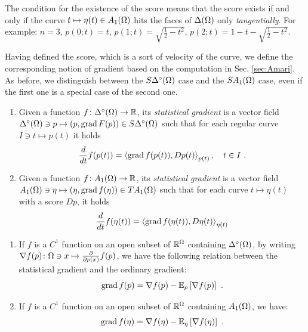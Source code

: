 \documentclass[12pt,a4paper]{amsart}
\begin{document}
\begin{remark}
  The condition for the existence of the score means that the score exists if and only if the curve $t \mapsto \eta(t) \in \AffineO$ hits the faces of $\SimO$ only \emph{tangentially}. For example: $n = 3$, $p(0;t) = t$, $p(1;t) = \sqrt{\frac12 - t^2}$, $p(2;t) = 1 - t - \sqrt{\frac12 - t^2}$. 
\end{remark}

Having defined the score, which is a sort of velocity of the curve, we define the corresponding notion of gradient based on the computation in Sec. \ref{sec:Amari}. As before, we distinguish between the $\SoSimO$ case and the $\SAffineO$ case, even if the first one is a special case of the second one.

\begin{definition}
\begin{enumerate}
\item Given a function $f \colon \oSimO \to \reals$, its \emph{statistical gradient} is a vector field $\oSimO \ni p \mapsto (p,\grad F(p)) \in \SoSimO$ such that for each regular curve $I \ni t \mapsto p(t)$ it holds
  \begin{equation*}
    \derivby t f(p(t)) = \scalarat {p(t)} {\grad f(p(t))} {Dp(t)}, \quad t \in I \ .
  \end{equation*}
%
\item Given a function $f \colon \AffineO \to \reals$, its \emph{statistical gradient} is a vector field $\AffineO \ni \eta \mapsto (\eta,\grad f(\eta)) \in T\AffineO$ such that for each curve $t \mapsto \eta(t)$ with a score $Dp$, it holds
  \begin{equation*}
    \derivby t f(\eta(t)) = \scalarat {\eta(t)} {\grad f(\eta(t))} {D\eta(t)}
  \end{equation*}
\end{enumerate}
\end{definition}

\begin{proposition}
  \begin{enumerate}
\item
If $f$ is a $C^1$ function on an open subset of $\reals^\Omega$ containing $\oSimO$, by writing $\nabla f(p) \colon \Omega \ni x \mapsto \partiald {p(x)} {f(p)}$, we have the following relation between the statistical gradient and the ordinary gradient:
%
\begin{equation*}
  \grad f (p) = \nabla f(p) - \expectat p {\nabla f(p)} \ .
\end{equation*}
\item
If $f$ is a $C^1$ function on an open subset of $\reals^\Omega$ containing $\AffineO$, we have:
%
\begin{equation*}
  \grad f(\eta) = \nabla f(\eta) - \expectat \eta {\nabla f(\eta)} \ .
\end{equation*}
\end{enumerate}
\end{proposition}
\end{document}
